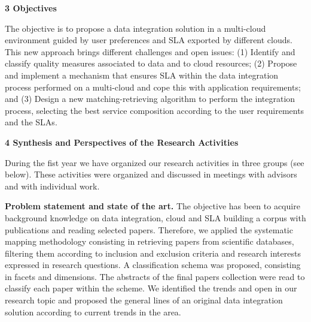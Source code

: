 \documentclass[11pt,a4paper,oneside]{report}
\begin{document}

\begin{flushleft}
\textbf{3 Objectives}\\
\end{flushleft}
The  objective is to propose a data integration solution in a multi-cloud environment guided by user preferences and SLA exported by different clouds. This new approach brings different challenges and open issues: (1)  Identify and classify quality measures associated to data and to cloud resources; (2) Propose and implement a mechanism that ensures SLA within the data integration process  performed on a multi-cloud and cope this with application requirements; and (3) Design a new matching-retrieving algorithm to perform the integration process, selecting the best service composition according to the user requirements and the SLAs.


 
\begin{flushleft}
\textbf{4 Synthesis and Perspectives of the Research Activities}\\
\end{flushleft}
During the fist year we have organized our research activities  in three groups (see below). These activities were organized and discussed in meetings with advisors and with individual work.
%

\noindent
\textbf{Problem statement and state of the art.} The objective has been to acquire background knowledge on data integration, cloud and SLA building a corpus with publications  and reading selected papers. Therefore, we applied the systematic mapping methodology consisting in retrieving papers from scientific databases,   filtering them according to inclusion and exclusion criteria and research interests expressed in research questions. A classification schema was  proposed, consisting in   facets and dimensions. The abstracts of the final papers collection were read  to classify each paper within the scheme.  We identified the trends and open in our research topic and proposed the general lines of  an original data integration solution according to current trends in the area.
\end{document}
